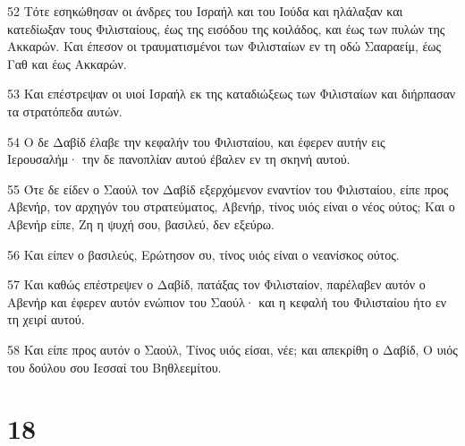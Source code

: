 \par 52 Τότε εσηκώθησαν οι άνδρες του Ισραήλ και του Ιούδα και ηλάλαξαν και κατεδίωξαν τους Φιλισταίους, έως της εισόδου της κοιλάδος, και έως των πυλών της Ακκαρών. Και έπεσον οι τραυματισμένοι των Φιλισταίων εν τη οδώ Σααραείμ, έως Γαθ και έως Ακκαρών.
\par 53 Και επέστρεψαν οι υιοί Ισραήλ εκ της καταδιώξεως των Φιλισταίων και διήρπασαν τα στρατόπεδα αυτών.
\par 54 Ο δε Δαβίδ έλαβε την κεφαλήν του Φιλισταίου, και έφερεν αυτήν εις Ιερουσαλήμ· την δε πανοπλίαν αυτού έβαλεν εν τη σκηνή αυτού.
\par 55 Ότε δε είδεν ο Σαούλ τον Δαβίδ εξερχόμενον εναντίον του Φιλισταίου, είπε προς Αβενήρ, τον αρχηγόν του στρατεύματος, Αβενήρ, τίνος υιός είναι ο νέος ούτος; Και ο Αβενήρ είπε, Ζη η ψυχή σου, βασιλεύ, δεν εξεύρω.
\par 56 Και είπεν ο βασιλεύς, Ερώτησον συ, τίνος υιός είναι ο νεανίσκος ούτος.
\par 57 Και καθώς επέστρεψεν ο Δαβίδ, πατάξας τον Φιλισταίον, παρέλαβεν αυτόν ο Αβενήρ και έφερεν αυτόν ενώπιον του Σαούλ· και η κεφαλή του Φιλισταίου ήτο εν τη χειρί αυτού.
\par 58 Και είπε προς αυτόν ο Σαούλ, Τίνος υιός είσαι, νέε; και απεκρίθη ο Δαβίδ, Ο υιός του δούλου σου Ιεσσαί του Βηθλεεμίτου.

\chapter{18}

